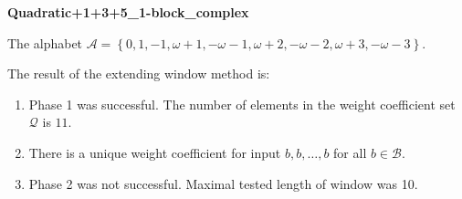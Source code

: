 \begin{exmp}
\textbf{ Quadratic+1+3+5\_1-block\_complex }

\label{ex:Quadratic+1+3+51-blockcomplex}

The alphabet $\mathcal{A} =\left\{0, 1, -1, \omega + 1, -\omega - 1, \omega + 2, -\omega - 2, \omega + 3, -\omega - 3\right\}$.

The result of the extending window method is:
\begin{enumerate}
    \item Phase 1 was successful.
The number of elements in the weight coefficient set $\mathcal{Q}$ is $11$.

    \item There is a unique weight coefficient for input $b,b,\dots,b$ for all $b\in\mathcal{B}$.

    \item Phase 2 was not successful. Maximal tested length of window was 10.

\end{enumerate}
\end{exmp}
